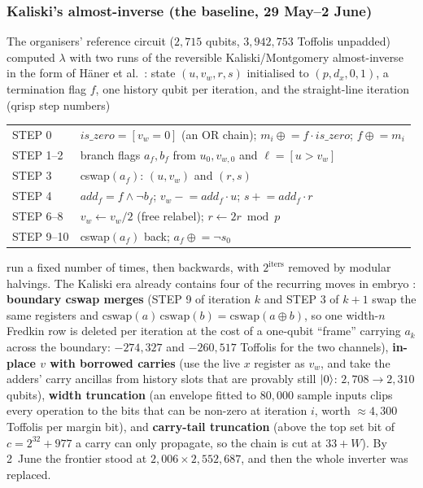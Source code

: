 \subsubsection{Kaliski's almost-inverse (the baseline, 29 May--2 June)}

The organisers' reference circuit ($2{,}715$ qubits, $3{,}942{,}753$ Toffolis unpadded) computed $\lambda$ with two runs of the reversible Kaliski/Montgomery almost-inverse in the form of H\"aner et al.\ \cite{hjnrs20}: state $(u,v_w,r,s)$ initialised to $(p,d_x,0,1)$, a termination flag $f$, one history qubit per iteration, and the straight-line iteration (qrisp step numbers)
\begin{center}\small
\begin{tabular}{@{}ll@{}}
STEP 0 & $\mathit{is\_zero}=[v_w=0]$ (an OR chain); $m_i\mathrel{\oplus}=f\cdot\mathit{is\_zero}$; $f\mathrel{\oplus}=m_i$\\
STEP 1--2 & branch flags $a_f,b_f$ from $u_0,v_{w,0}$ and $\ell=[u>v_w]$\\
STEP 3 & cswap$(a_f)$: $(u,v_w)$ and $(r,s)$\\
STEP 4 & $\mathit{add}_f=f\wedge\neg b_f$; $v_w\mathrel{-}=\mathit{add}_f\cdot u$; $s\mathrel{+}=\mathit{add}_f\cdot r$\\
STEP 6--8 & $v_w\gets v_w/2$ (free relabel); $r\gets 2r\bmod p$\\
STEP 9--10 & cswap$(a_f)$ back; $a_f\mathrel{\oplus}=\neg s_0$
\end{tabular}
\end{center}
run a fixed number of times, then backwards, with $2^{\text{iters}}$ removed by modular halvings. The Kaliski era already contains four of the recurring moves in embryo \cite{ecdsafail-wiki}: \textbf{boundary cswap merges} (STEP 9 of iteration $k$ and STEP 3 of $k+1$ swap the same registers and $\mathrm{cswap}(a)\,\mathrm{cswap}(b)=\mathrm{cswap}(a\oplus b)$, so one width-$n$ Fredkin row is deleted per iteration at the cost of a one-qubit ``frame'' carrying $a_k$ across the boundary: $-274{,}327$ and $-260{,}517$ Toffolis for the two channels), \textbf{in-place $v$ with borrowed carries} (use the live $x$ register as $v_w$, and take the adders' carry ancillas from history slots that are provably still $\lvert 0 \rangle$: $2{,}708\to2{,}310$ qubits), \textbf{width truncation} (an envelope fitted to $80{,}000$ sample inputs clips every operation to the bits that can be non-zero at iteration $i$, worth $\approx4{,}300$ Toffolis per margin bit), and \textbf{carry-tail truncation} (above the top set bit of $c=2^{32}+977$ a carry can only propagate, so the chain is cut at $33+W$). By 2~June the frontier stood at $2{,}006\times2{,}552{,}687$, and then the whole inverter was replaced.

